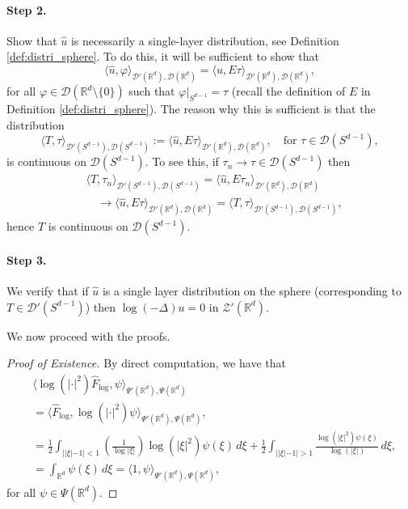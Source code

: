 \documentclass[11pt]{amsart}
\newcommand{\R}{\mathbb{R}}
\begin{document}
	\paragraph{Step 2.} Show that $\hat{u}$ is necessarily a single-layer distribution, see Definition \ref{def:distri_sphere}. To do this, it will be sufficient to show that 
	\begin{equation}\label{eqn:single_layer}
		\langle \hat{u},\varphi\rangle_{\mathcal{D}'(\R^d),\mathcal{D}(\R^d)}=	\langle \hat{u},E\tau\rangle_{\mathcal{D}'(\R^d),\mathcal{D}(\R^d)},
	\end{equation} 
	for all $\varphi\in \mathcal{D}(\R^d\setminus\{0\})$ such that $\varphi|_{S^{d-1}}=\tau$ (recall the definition of $E$ in Definition \ref{def:distri_sphere}). The reason why this is sufficient is that the distribution
	\begin{equation*}
		\langle T,\tau\rangle_{\mathcal{D}'(S^{d-1}),\mathcal{D}(S^{d-1})}:=		\langle \hat{u},E\tau\rangle_{\mathcal{D}'(\R^d),\mathcal{D}(\R^d)},\quad \text{for $\tau \in \mathcal{D}(S^{d-1})$},
	\end{equation*}
	is continuous on $\mathcal{D}(S^{d-1})$. To see this, if $\tau_n\rightarrow \tau\in \mathcal{D}(S^{d-1})$ then 
	\begin{equation*}
	\begin{split}
		&\langle T,\tau_n\rangle_{\mathcal{D}'(S^{d-1}),\mathcal{D}(S^{d-1})}=\langle \hat{u},E\tau_n\rangle_{\mathcal{D}'(\R^d),\mathcal{D}(\R^d)}\\
		&\quad \rightarrow \langle \hat{u},E\tau\rangle_{\mathcal{D}'(\R^d),\mathcal{D}(\R^d)}=\langle T,\tau\rangle_{\mathcal{D}'(S^{d-1}),\mathcal{D}(S^{d-1})},
	\end{split} 
	\end{equation*}
	hence $T$ is continuous on $\mathcal{D}(S^{d-1})$. 
	\paragraph{Step 3.} We verify that if $\hat{u}$ is a single layer distribution on the sphere (corresponding to $T\in \mathcal{D}'(S^{d-1})$) then 
	$\log(-\Delta)u=0$ in $\mathcal{Z}'(\R^d)$. 

We now proceed with the proofs. 

\begin{proof}[Proof of Existence]
	By direct computation, we have that 
	\begin{equation*}
		\begin{split}
			&\langle \log(|\cdot|^2)\hat{F}_{\log},\psi \rangle_{\Psi'(\R^d),\Psi(\R^d)}\\
			&=\langle \hat{F}_{\log},\log(|\cdot|^2)\psi \rangle_{\Psi'(\R^d),\Psi(\R^d)},\\
			&=\frac{1}{2}\int_{||\xi|-1|<1}\left (\frac{1}{\log|\xi|}\right )\log(|\xi|^2)\psi(\xi)\,d\xi+\frac{1}{2}\int_{||\xi|-1|>1}\frac{\log(|\xi|^2)\psi(\xi)}{\log(|\xi|)}\,d\xi,\\
			&=\int_{\R^d}\psi(\xi)\,d\xi=\langle 1,\psi\rangle_{\Psi'(\R^d),\Psi(\R^d)}, 
		\end{split}
	\end{equation*}
	for all $\psi \in \Psi(\R^d)$.
\end{proof}
\end{document}
